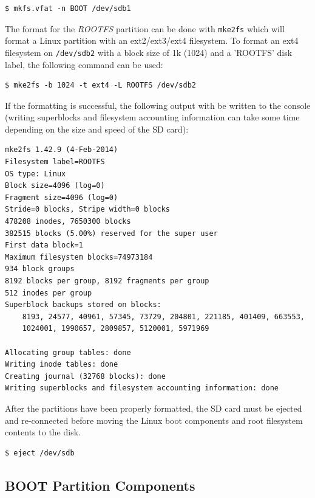 \begin{lstlisting}
$ mkfs.vfat -n BOOT /dev/sdb1
\end{lstlisting}


The format for the \textit{ROOTFS} partition can be done with \texttt{mke2fs} which will format a Linux partition with an ext2/ext3/ext4 filesystem. To format an ext4 filesystem on \texttt{/dev/sdb2} with a block size of 1k (1024) and a 'ROOTFS' disk label, the following command can be used:



\begin{lstlisting}
$ mke2fs -b 1024 -t ext4 -L ROOTFS /dev/sdb2
\end{lstlisting}


If the formatting is successful, the following output with be written to the console (writing superblocks and filesystem accounting information can take some time depending on the size and speed of the SD card):


\begin{lstlisting}[style=text]
mke2fs 1.42.9 (4-Feb-2014)
Filesystem label=ROOTFS
OS type: Linux
Block size=4096 (log=0)
Fragment size=4096 (log=0)
Stride=0 blocks, Stripe width=0 blocks
478208 inodes, 7650300 blocks
382515 blocks (5.00%) reserved for the super user
First data block=1
Maximum filesystem blocks=74973184
934 block groups
8192 blocks per group, 8192 fragments per group
512 inodes per group
Superblock backups stored on blocks: 
	8193, 24577, 40961, 57345, 73729, 204801, 221185, 401409, 663553, 
	1024001, 1990657, 2809857, 5120001, 5971969

Allocating group tables: done                            
Writing inode tables: done                            
Creating journal (32768 blocks): done
Writing superblocks and filesystem accounting information: done   
\end{lstlisting}


After the partitions have been properly formatted, the SD card must be ejected and re-connected before moving the Linux boot components and root filesystem contents to the disk.


\begin{lstlisting}
$ eject /dev/sdb
\end{lstlisting}


\subsection{BOOT Partition Components}

